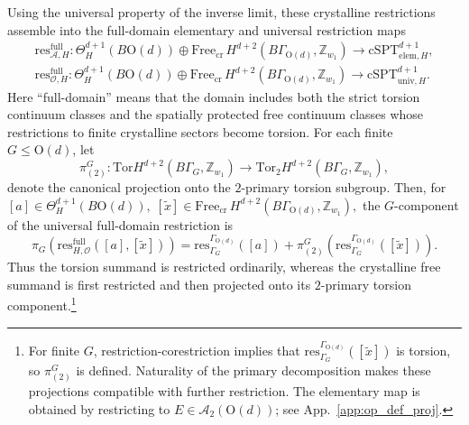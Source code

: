 \documentclass[aps,prx,reprint,superscriptaddress,twocolumn,amsmath,amssymb,amsfonts, nofootinbib]{revtex4-2}
\newcommand{\res}{\text{res}}
\newcommand{\tor}{\text{Tor}}
\newcommand{\Z}{\mathbb{Z}}
\theoremstyle{apsstyle}
\begin{document}
{Using the universal property of the inverse limit, these crystalline restrictions assemble into the full-domain elementary and universal restriction maps
\begin{gather}
\label{eq:elem_res_H}
\res^{\mathrm{full}}_{\mathcal A,H}: \Theta^{d+1}_{H}(B\mathrm{O}(d)) \oplus \mathrm{Free}_{\mathrm{cr}}\,
H^{d+2}(B\Gamma_{\mathrm{O}(d)},\Z_{w_1}) \longrightarrow \mathrm{cSPT}^{d+1}_{\mathrm{elem},H},
\\
\res^{\mathrm{full}}_{\mathcal O,H}: \Theta^{d+1}_{H}(B\mathrm{O}(d)) \oplus
\mathrm{Free}_{\mathrm{cr}}\, H^{d+2}(B\Gamma_{\mathrm{O}(d)},\Z_{w_1}) \longrightarrow \mathrm{cSPT}^{d+1}_{\mathrm{univ},H}.
\label{eq:finite_res_H}
\end{gather}
Here ``full-domain'' means that the domain includes both the strict torsion continuum classes and the spatially protected free continuum classes whose restrictions to finite crystalline sectors become torsion. For each finite $G\leq\mathrm{O}(d)$, let
\begin{equation*}
\pi_{(2)}^{G}: \tor H^{d+2}(B\Gamma_G,\mathbb Z_{w_1})
\longrightarrow \tor_2 H^{d+2}(B\Gamma_G,\mathbb Z_{w_1}),
\end{equation*}
denote the canonical projection onto the $2$-primary torsion subgroup. Then, for $[a]\in\Theta_H^{d+1}(B\mathrm{O}(d)), \; [\widetilde x]\in \mathrm{Free}_{\mathrm{cr}}\, H^{d+2}(B\Gamma_{\mathrm{O}(d)},\mathbb Z_{w_1}), $ the $G$-component of the universal full-domain restriction is
\begin{equation}
\pi_G\!\left( \res^{\mathrm{full}}_{H,\mathcal O} ([a],[\widetilde x]) \right)
= \res^{\Gamma_{\mathrm{O}(d)}}_{\Gamma_G}([a]) +
\pi_{(2)}^{G}\!\left( \res^{\Gamma_{\mathrm{O}(d)}}_{\Gamma_G}([\widetilde x]) \right).
\label{eq:full_domain_restriction_component}
\end{equation}
Thus the torsion summand is restricted ordinarily, whereas the crystalline free summand is first restricted and then projected onto its $2$-primary torsion component.}\footnote{\label{fn:full_domain_restriction} For finite $G$, restriction-corestriction implies that $\res^{\Gamma_{\mathrm{O}(d)}}_{\Gamma_G}([\widetilde x])$ is torsion, so $\pi_{(2)}^{G}$ is defined. Naturality of the primary decomposition makes these projections compatible with further restriction. The elementary map is obtained by restricting to $E\in\mathcal A_2(\mathrm{O}(d))$; see App.~\ref{app:op_def_proj}.}

\bigskip 
\end{document}
